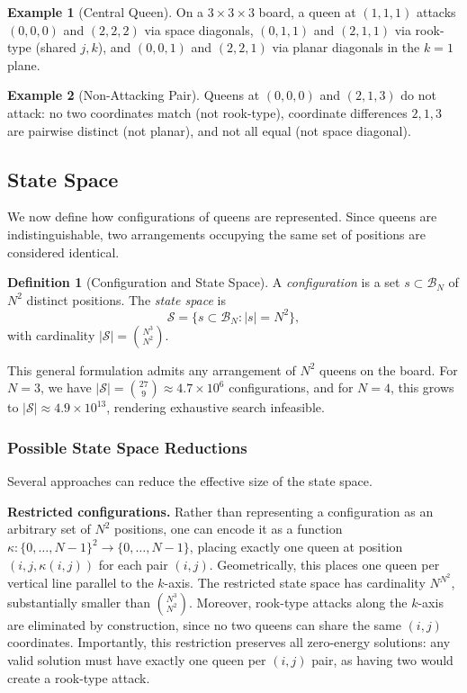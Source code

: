 \documentclass[10pt,twocolumn,a4paper]{article}
\newcommand{\statespace}{\mathcal{S}}
\newcommand{\board}{\mathcal{B}}
\theoremstyle{definition}
\newtheorem{definition}{Definition}[section]
\newtheorem{example}{Example}[section]
\theoremstyle{remark}
\begin{document}
\begin{example}[Central Queen]
On a $3\times3\times3$ board, a queen at $(1,1,1)$ attacks $(0,0,0)$ and $(2,2,2)$ via space diagonals, $(0,1,1)$ and $(2,1,1)$ via rook-type (shared $j,k$), and $(0,0,1)$ and $(2,2,1)$ via planar diagonals in the $k=1$ plane.
\end{example}

\begin{example}[Non-Attacking Pair]
Queens at $(0,0,0)$ and $(2,1,3)$ do not attack: no two coordinates match (not rook-type), coordinate differences $2,1,3$ are pairwise distinct (not planar), and not all equal (not space diagonal).
\end{example}

\subsection{State Space}
We now define how configurations of queens are represented. Since queens are indistinguishable, two arrangements occupying the same set of positions are considered identical.

\begin{definition}[Configuration and State Space]
A \emph{configuration} is a set $s\subset\board_N$ of $N^2$ distinct positions. The \emph{state space} is
\[
\statespace=\bigl\{s\subset\board_N:|s|=N^2\bigr\},
\]
with cardinality $|\statespace|=\binom{N^3}{N^2}$.
\end{definition}
This general formulation admits any arrangement of $N^2$ queens on the board. For $N=3$, we have $|\statespace|=\binom{27}{9}\approx4.7\times10^6$ configurations, and for $N=4$, this grows to $|\statespace|\approx4.9\times10^{13}$, rendering exhaustive search infeasible.

\subsubsection{Possible State Space Reductions}
Several approaches can reduce the effective size of the state space.

\textbf{Restricted configurations.} Rather than representing a configuration as an arbitrary set of $N^2$ positions, one can encode it as a function $\kappa:\{0,\ldots,N-1\}^2\to\{0,\ldots,N-1\}$, placing exactly one queen at position $(i,j,\kappa(i,j))$ for each pair $(i,j)$. Geometrically, this places one queen per vertical line parallel to the $k$-axis. The restricted state space has cardinality $N^{N^2}$, substantially smaller than $\binom{N^3}{N^2}$. Moreover, rook-type attacks along the $k$-axis are eliminated by construction, since no two queens can share the same $(i,j)$ coordinates. Importantly, this restriction preserves all zero-energy solutions: any valid solution must have exactly one queen per $(i,j)$ pair, as having two would create a rook-type attack.
\end{document}
